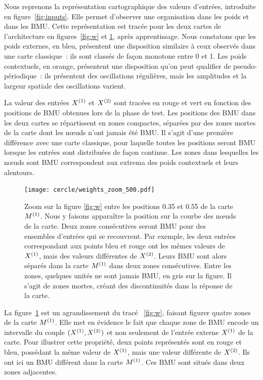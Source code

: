 \documentclass[../main]{subfiles}
\begin{document}
Nous reprenons la représentation cartographique des valeurs d'entrées, introduite en figure~\ref{fig:inputs}. Elle permet d'observer une organisation dans les poids et dans les BMU.
Cette représentation est tracée pour les deux cartes de l'architecture en figures~\ref{fig:w} et \ref{fig:w_zoom}, après apprentissage.
Nous constatons que les poids externes, en bleu, présentent une disposition similaire à ceux observés dans une carte classique~: ils sont classés de façon monotone entre 0 et 1. Les poids contextuels, en orange, présentent une disposition qu'on peut qualifier de pseudo-périodique~: ils présentent des oscillations régulières, mais les amplitudes et la largeur spatiale des oscillations varient.

La valeur des entrées $X^{({1})}$ et $X^{({2})}$ sont tracées en rouge et vert en fonction des positions de BMU obtenues lors de la phase de test.
Les positions des BMU dans les deux cartes se répartissent en zones compactes, séparées par des zones mortes de la carte dont les n\oe{}uds n'ont jamais été BMU. 
Il s'agit d'une première différence avec une carte classique, pour laquelle toutes les positions seront BMU lorsque les entrées sont distribuées de façon continue. Les zones dans lesquelles les n\oe{}uds sont BMU correspondent aux extrema des poids contextuels et leurs alentours.


\begin{figure}
	\centering\texttt{[image: cercle/weights\_zoom\_500.pdf]}
   \caption{Zoom sur la figure \ref{fig:w} entre les positions 0.35 et 0.55 de la carte $M^{({1})}$. 
   Nous y faisons apparaître la position sur la courbe des n\oe{}uds de la carte.
   Deux zones consécutives seront BMU pour des ensembles d'entrées qui se recouvrent. Par exemple, les deux entrées correspondant aux points bleu et rouge ont les mêmes valeurs de $X^{({1})}$, mais des valeurs différentes de $X^{({2})}$. Leurs BMU sont alors séparés dans la carte $M^{({1})}$ dans deux zones consécutives.
   Entre les zones, quelques unités ne sont jamais BMU, en gris sur la figure. Il s'agit de zones mortes, créant des discontinuités dans la réponse de la carte.
   \label{fig:w_zoom}}
\end{figure}

La figure~\ref{fig:w_zoom} est un agrandissement du tracé ~\ref{fig:w}, faisant figurer quatre zones de la carte $M^{({1})}$. 
Elle met en évidence le fait que chaque zone de BMU encode un intervalle du couple $(X^{({1})}, X^{({2})})$ et non seulement de l'entrée externe $X^{({1})}$ de la carte.
Pour illustrer cette propriété, deux points représentés sont en rouge et bleu, possédant la même valeur de $X^{({1})}$, mais une valeur différente de $X^{({2})}$. Ils ont ici un BMU différent dans la carte $M^{({1})}$. Ces BMU sont situés dans deux zones adjacentes.
\end{document}
